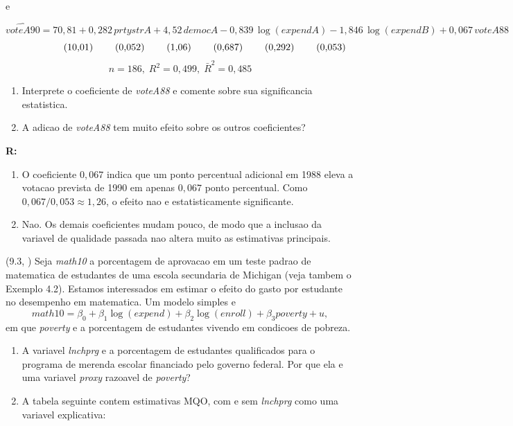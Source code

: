 \documentclass[12pt,letterpaper, onecolumn]{exam}
\renewenvironment{solution}
{\par\noindent\textbf{R:}\enspace\color{blue}}
{\par\color{black}}
\begin{document}
\begin{questions}
e

\[
\widehat{voteA90}=70{,}81+0{,}282\,prtystrA+4{,}52\,democA-0{,}839\,\log(expendA)-1{,}846\,\log(expendB)+0{,}067\,voteA88
\]
\[
\hspace{1.8cm}(10{,}01)\hspace{0.8cm}(0{,}052)\hspace{0.8cm}(1{,}06)\hspace{0.8cm}(0{,}687)\hspace{0.8cm}(0{,}292)\hspace{0.8cm}(0{,}053)
\]
\[
n=186,\; R^2=0{,}499,\; \bar{R}^2=0{,}485
\]

\begin{enumerate}[label=(\roman*)]
    \item Interprete o coeficiente de \textit{voteA88} e comente sobre sua significancia estatistica.
    \item A adicao de \textit{voteA88} tem muito efeito sobre os outros coeficientes?
\end{enumerate}

\begin{solution}
\begin{enumerate}[label=(\roman*)]
    \item O coeficiente \(0,067\) indica que um ponto percentual adicional em 1988 eleva a votacao prevista de 1990 em apenas \(0,067\) ponto percentual. Como \(0,067/0,053\approx 1,26\), o efeito nao e estatisticamente significante.
    \item Nao. Os demais coeficientes mudam pouco, de modo que a inclusao da variavel de qualidade passada nao altera muito as estimativas principais.
\end{enumerate}
\end{solution}

\vspace{0.7cm}

\question (9.3, \citep{wooldridge2016}) Seja \textit{math10} a porcentagem de aprovacao em um teste padrao de matematica de estudantes de uma escola secundaria de Michigan (veja tambem o Exemplo 4.2). Estamos interessados em estimar o efeito do gasto por estudante no desempenho em matematica. Um modelo simples e
\[
math10=\beta_0+\beta_1\log(expend)+\beta_2\log(enroll)+\beta_3 poverty+u,
\]
em que \textit{poverty} e a porcentagem de estudantes vivendo em condicoes de pobreza.
\begin{enumerate}[label=(\roman*)]
    \item A variavel \textit{lnchprg} e a porcentagem de estudantes qualificados para o programa de merenda escolar financiado pelo governo federal. Por que ela e uma variavel \textit{proxy} razoavel de \textit{poverty}?
    \item A tabela seguinte contem estimativas MQO, com e sem \textit{lnchprg} como uma variavel explicativa:
\end{enumerate}


\end{questions}
\end{document}
